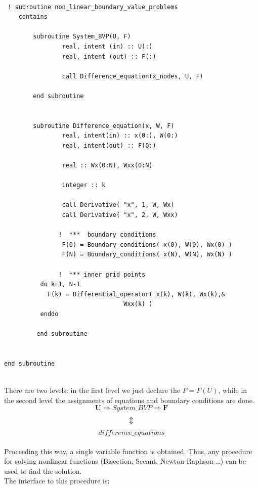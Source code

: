  \begin{blueframed}
 \begin{lstlisting}
 
 ! subroutine non_linear_boundary_value_problems
    contains

        subroutine System_BVP(U, F)
                real, intent (in) :: U(:)
                real, intent (out) :: F(:)

                call Difference_equation(x_nodes, U, F)

        end subroutine


        subroutine Difference_equation(x, W, F)
                real, intent(in) :: x(0:), W(0:)
                real, intent(out) :: F(0:)

                real :: Wx(0:N), Wxx(0:N)

                integer :: k

                call Derivative( "x", 1, W, Wx)
                call Derivative( "x", 2, W, Wxx)

               !  ***  boundary conditions
                F(0) = Boundary_conditions( x(0), W(0), Wx(0) )
                F(N) = Boundary_conditions( x(N), W(N), Wx(N) )

               !  *** inner grid points
          do k=1, N-1
            F(k) = Differential_operator( x(k), W(k), Wx(k),&
            					 Wxx(k) )
          enddo
               
         end subroutine


end subroutine
 
 \end{lstlisting}
 
 
 \end{blueframed}

There are two levels: in the first level we just declare the $F=F(U)$, while in
the second level the assignments of equations and boundary conditions are done.
\\


$$ \mathbf{U} \Longrightarrow \boxed{System\_BVP} \Longrightarrow \mathbf{F}$$
$$ \hfill \Updownarrow $$
$$ \boxed{difference\_equations}$$\\

Proceeding this way, a single variable function is obtained. Thus, any procedure
for solving nonlinear functions (Bisection, Secant, Newton-Raphson \ldots ) can be
used to find the solution.\\

The interface to this procedure is: 

